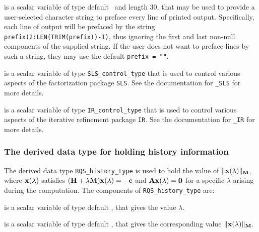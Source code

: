 \documentclass{galahad}
\newcommand{\packagename}{RQS}
\begin{document}
\begin{description}
 is a scalar variable of type default \character\
and length 30, that may be used to provide a user-selected
character string to preface every line of printed output.
Specifically, each line of output will be prefaced by the string
{\tt prefix(2:LEN(TRIM(prefix))-1)},
thus ignoring the first and last non-null components of the
supplied string. If the user does not want to preface lines by such
a string, they may use the default {\tt prefix = ""}.

 is a scalar variable of type
{\tt SLS\_control\_type} that is used to control various aspects of the
factorization package {\tt SLS}. See the documentation for
{\tt \libraryname\_SLS} for more details.

 is a scalar variable of type
{\tt IR\_control\_type} that is used to control various aspects of the
iterative refinement package {\tt IR}. See the documentation for
{\tt \libraryname\_IR} for more details.

\end{description}


\subsubsection{The derived data type for holding history
 information}\label{typehist}
The derived data type
{\tt \packagename\_history\_type}
is used to hold the value of $\|{\mathbf{x}}(\lambda)\|_{{\mathbf{M}}}$, where
${\mathbf{x}}(\lambda)$ satisfies
$({\mathbf{H}} + \lambda {\mathbf{M}}){\mathbf{x}}(\lambda) = - {\mathbf{c}}$ and ${\mathbf{A}}{\mathbf{x}}(\lambda) = {\mathbf{0}}$
for a specific $\lambda$ arising during the computation.
The components of
{\tt \packagename\_history\_type}
are:
\begin{description}
 is a scalar variable of type default \realdp, that gives
 the value $\lambda$.

 is a scalar variable of type default \real, that gives
 the corresponding value $\|{\mathbf{x}}(\lambda)\|_{{\mathbf{M}}}$.

\end{description}

\end{document}
